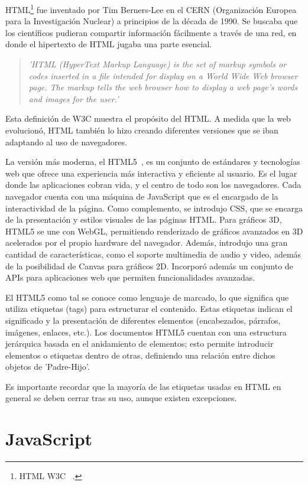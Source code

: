 \documentclass[a4paper, 12pt]{book}
\begin{document}
HTML\footnote{HTML W3C ~\cite{w3c-html-intro}.} fue inventado por Tim Berners-Lee en el CERN (Organización Europea para la Investigación Nuclear) a principios de la década de 1990. Se buscaba que los científicos pudieran compartir información fácilmente a través de una red, en donde el hipertexto de HTML jugaba una parte esencial.
\begin{quote}
\textit{'HTML (HyperText Markup Language) is the set of markup symbols or codes inserted in a file intended for display on a World Wide Web browser page. The markup tells the web browser how to display a web page's words and images for the user.'} \cite{w3c-html-intro}  
\end{quote}

Esta definición de W3C muestra el propósito del HTML. A medida que la web evolucionó, HTML también lo hizo creando diferentes versiones que se iban adaptando al uso de navegadores.

La versión más moderna, el HTML5~\cite{gauchat2012gran}, es un conjunto de estándares y tecnologías web que ofrece una experiencia más interactiva y eficiente al usuario. 
Es el lugar donde las aplicaciones cobran vida, y el centro de todo son los navegadores. Cada navegador cuenta con una máquina de JavaScript que es el encargado de la interactividad de la página. 
Como complemento, se introdujo CSS, que se encarga de la presentación y estilos visuales de las páginas HTML.
Para gráficos 3D, HTML5 se une con WebGL, permitiendo renderizado de gráficos avanzados en 3D acelerados por el propio hardware del navegador.
Además, introdujo una gran cantidad de características, como el soporte multimedia de audio y video, además de la posibilidad de Canvas para gráficos 2D.
Incorporó además un conjunto de APIs para aplicaciones web que permiten funcionalidades avanzadas.

El HTML5 como tal se conoce como lenguaje de marcado, lo que significa que utiliza etiquetas (tags) para estructurar el contenido. Estas etiquetas indican el significado y la presentación de diferentes elementos (encabezados, párrafos, imágenes, enlaces, etc.). 
Los documentos HTML5 cuentan con una estructura jerárquica basada en el anidamiento de elementos; esto permite introducir elementos o etiquetas dentro de otras, definiendo una relación entre dichos objetos de 'Padre-Hijo'.

Es importante recordar que la mayoría de las etiquetas usadas en HTML en general se deben cerrar tras su uso, aunque existen excepciones.

\section{JavaScript} 
\label{sec:seccion7}
\end{document}

